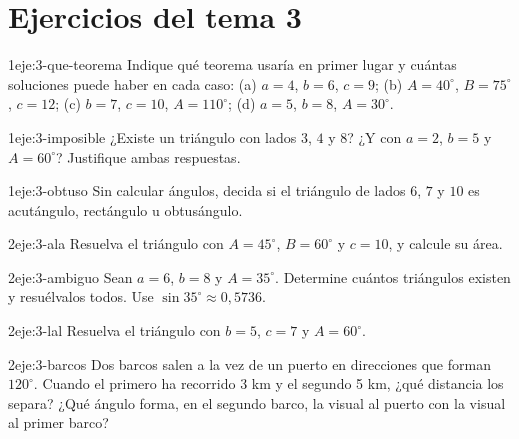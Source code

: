 \section*{Ejercicios del tema 3}

\begin{ejercicio}{1}{eje:3-que-teorema}
Indique qué teorema usaría en primer lugar y cuántas soluciones puede haber en cada caso: (a) $a=4$, $b=6$, $c=9$; (b) $A=40^{\circ}$, $B=75^{\circ}$, $c=12$; (c) $b=7$, $c=10$, $A=110^{\circ}$; (d) $a=5$, $b=8$, $A=30^{\circ}$.
\end{ejercicio}

\begin{ejercicio}{1}{eje:3-imposible}
¿Existe un triángulo con lados $3$, $4$ y $8$? ¿Y con $a=2$, $b=5$ y $A=60^{\circ}$? Justifique ambas respuestas.
\end{ejercicio}

\begin{ejercicio}{1}{eje:3-obtuso}
Sin calcular ángulos, decida si el triángulo de lados $6$, $7$ y $10$ es acutángulo, rectángulo u obtusángulo.
\end{ejercicio}

\begin{ejercicio}{2}{eje:3-ala}
Resuelva el triángulo con $A=45^{\circ}$, $B=60^{\circ}$ y $c=10$, y calcule su área.
\end{ejercicio}

\begin{ejercicio}{2}{eje:3-ambiguo}
Sean $a=6$, $b=8$ y $A=35^{\circ}$. Determine cuántos triángulos existen y resuélvalos todos. Use $\sin35^{\circ}\approx0{,}5736$.
\end{ejercicio}

\begin{ejercicio}{2}{eje:3-lal}
Resuelva el triángulo con $b=5$, $c=7$ y $A=60^{\circ}$.
\end{ejercicio}

\begin{ejercicio}{2}{eje:3-barcos}
Dos barcos salen a la vez de un puerto en direcciones que forman $120^{\circ}$. Cuando el primero ha recorrido 3 km y el segundo 5 km, ¿qué distancia los separa? ¿Qué ángulo forma, en el segundo barco, la visual al puerto con la visual al primer barco?
\end{ejercicio}

